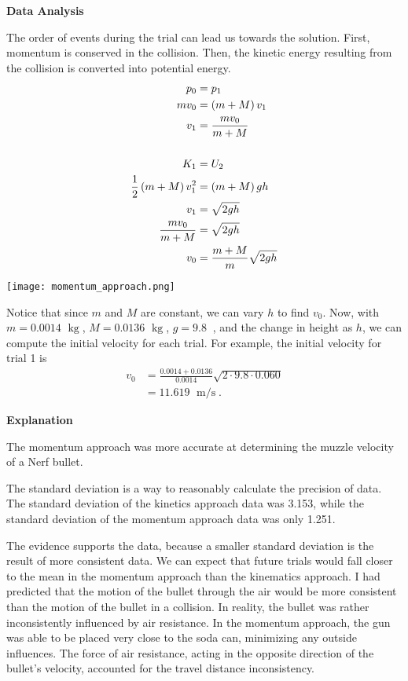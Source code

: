 \documentclass[12pt]{article}
\newcommand{\paren}[1]{\left({#1}\right)}
\newcommand{\double}[0]{\par\null\par}
\DeclareMathOperator{\ms}{\ m/s}
\DeclareMathOperator{\mssq}{\ m/s^2}
\DeclareMathOperator{\kg}{\ kg}
\newcommand{\bigheader}[1]{\LARGE\textbf{#1}\normalsize}
\newcommand{\header}[1]{\large\textbf{#1}\normalsize}
\begin{document}
\double\header{Data Analysis}

The order of events during the trial can lead us towards the solution.
First, momentum is conserved in the collision.
Then, the kinetic energy resulting from the collision is converted into potential energy.
\begin{align*}
p_0&=p_1 \\
mv_0&=\paren{m+M}v_1 \\
v_1&=\frac{mv_0}{m+M} \\
\null \\
K_1&=U_2 \\
\frac{1}{2}\paren{m+M}v_1^2&=\paren{m+M}gh \\
v_1&=\sqrt{2gh} \\
\frac{mv_0}{m+M}&=\sqrt{2gh} \\
v_0&=\frac{m+M}{m}\sqrt{2gh}
\end{align*}

\begin{center}
\texttt{[image: momentum\_approach.png]}
\end{center}

Notice that since $m$ and $M$ are constant, we can vary $h$ to find $v_0$. Now, with $m=0.0014\kg$, $M=0.0136\kg$,
$g=9.8\mssq$, and the change in height as $h$, we can compute the initial velocity for each trial. For example, the initial
velocity for trial 1 is
\begin{align*}
v_0&=\frac{0.0014+0.0136}{0.0014}\sqrt{2\cdot9.8\cdot0.060} \\
&=11.619\ms.
\end{align*}

\double\bigheader{Explanation}

The momentum approach was more accurate at determining the muzzle velocity of a Nerf bullet.\double

The standard deviation is a way to reasonably calculate the precision of data. The standard deviation of the kinetics approach
data was 3.153, while the standard deviation of the momentum approach data was only 1.251.\double

The evidence supports the data, because a smaller standard deviation is the result of more consistent data. We can expect that
future trials would fall closer to the mean in the momentum approach than the kinematics approach. I had predicted that the
motion of the bullet through the air would be more consistent than the motion of the bullet in a collision. In reality, the
bullet was rather inconsistently influenced by air resistance. In the momentum approach, the gun was able to be placed very
close to the soda can, minimizing any outside influences. The force of air resistance, acting in the opposite direction of the
bullet's velocity, accounted for the travel distance inconsistency.\double
\end{document}
